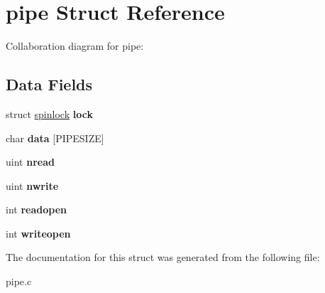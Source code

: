 \hypertarget{structpipe}{}\section{pipe Struct Reference}
\label{structpipe}


Collaboration diagram for pipe\+:
\subsection*{Data Fields}
\begin{DoxyCompactItemize}
\item 
\mbox{\label{structpipe_a0ce399a2ba316d11cb8e678069bfd5b4}} 
struct \mbox{\hyperlink{structspinlock}{spinlock}} {\bfseries lock}
\item 
\mbox{\label{structpipe_ab02ae9fa0b8b092512c28c7c080f0c7b}} 
char {\bfseries data} \mbox{[}P\+I\+P\+E\+S\+I\+ZE\mbox{]}
\item 
\mbox{\label{structpipe_ad71eb56c445f9178dac07ae47f352fd1}} 
uint {\bfseries nread}
\item 
\mbox{\label{structpipe_a419b6fc2780013358de51c91371dac66}} 
uint {\bfseries nwrite}
\item 
\mbox{\label{structpipe_a7bdc57b39ef97dda61e468ad9e8dbfba}} 
int {\bfseries readopen}
\item 
\mbox{\label{structpipe_a9538da698ddd63615c991a318094663b}} 
int {\bfseries writeopen}
\end{DoxyCompactItemize}


The documentation for this struct was generated from the following file\+:\begin{DoxyCompactItemize}
\item 
pipe.\+c\end{DoxyCompactItemize}
